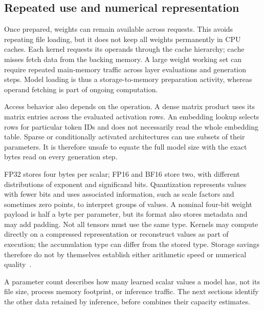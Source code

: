 \subsection{Repeated use and numerical representation}

Once prepared, weights can remain available across requests.  This
avoids repeating file loading, but it does not keep all weights
permanently in CPU caches.  Each kernel requests its operands through
the cache hierarchy; cache misses fetch data from the backing memory.
A large weight working set can require repeated main-memory traffic
across layer evaluations and generation steps.  Model loading is thus
a storage-to-memory preparation activity, whereas operand fetching is
part of ongoing computation.

Access behavior also depends on the operation.  A dense matrix product
uses its matrix entries across the evaluated activation rows.  An
embedding lookup selects rows for particular token IDs and does not
necessarily read the whole embedding table.  Sparse or conditionally
activated architectures can use subsets of their parameters.  It is
therefore unsafe to equate the full model size with the exact bytes read
on every generation step.

FP32 stores four bytes per scalar; FP16 and BF16 store two, with
different distributions of exponent and significand bits.  Quantization
represents values with fewer bits and uses associated information, such
as scale factors and sometimes zero points, to interpret groups of
values.  A nominal four-bit weight payload is half a byte per parameter,
but its format also stores metadata and may add padding.  Not all
tensors must use the same type.  Kernels may compute directly on a
compressed representation or reconstruct values as part of execution;
the accumulation type can differ from the stored type.  Storage savings
therefore do not by themselves establish either arithmetic speed or
numerical quality~\cite{llamacppproject2026}.

A parameter count describes how many learned scalar values a model has,
not its file size, process memory footprint, or inference traffic.  The
next sections identify the other data retained by inference, before
 combines their capacity estimates.
\FloatBarrier
